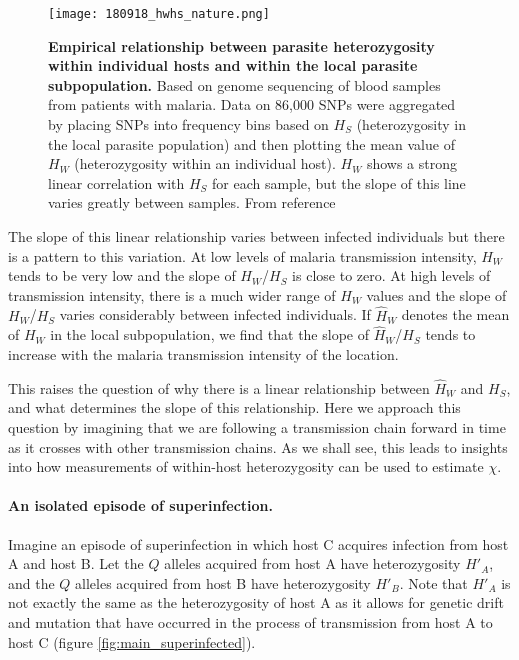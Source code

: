 \documentclass[_main.tex]{subfiles}
\begin{document}
\begin{figure}[h!]
\centering
\texttt{[image: 180918\_hwhs\_nature.png]}
\caption{\textbf{Empirical relationship between parasite heterozygosity within individual hosts and within the local parasite subpopulation.}  Based on genome sequencing of blood samples from patients with malaria.  Data on 86,000 SNPs were aggregated by placing SNPs into frequency bins based on $H_S$ (heterozygosity in the local parasite population) and then plotting the mean value of $H_W$ (heterozygosity within an individual host).  $H_W$ shows a strong linear correlation with $H_S$ for each sample, but the slope of this line varies greatly between samples. From reference \cite{Manske2012}}
\label{fig:hwhs_nature}
\end{figure}

The slope of this linear relationship varies between infected individuals but there is a pattern to this variation.  At low levels of malaria transmission intensity, $H_W$ tends to be very low and the slope of $H_W$/$H_S$ is close to zero.  At high levels of transmission intensity, there is a much wider range of $H_W$ values and the slope of $H_W$/$H_S$ varies considerably between infected individuals.  If  $\widehat{H}_W$ denotes the mean of $H_W$ in the local subpopulation, we find that the slope of $\widehat{H}_W$/$H_S$ tends to increase with the malaria transmission intensity of the location.

This raises the question of why there is a linear relationship between $\widehat{H}_W$ and $H_S$, and what determines the slope of this relationship.  Here we approach this question by imagining that we are following a transmission chain forward in time as it crosses with other transmission chains.  As we shall see, this leads to insights into how measurements of within-host heterozygosity can be used to estimate $\chi$.

\paragraph{An isolated episode of superinfection.}  Imagine an episode of superinfection in which host C acquires infection from host A and host B.  Let the $Q$ alleles acquired from host A have heterozygosity $H'_A$, and the $Q$ alleles acquired from host B have heterozygosity $H'_B$.  Note that $H'_A$ is not exactly the same as the heterozygosity of host A as it allows for genetic drift and mutation that have occurred in the process of transmission from host A to host C (figure \ref{fig:main_superinfected}).  
\end{document}
